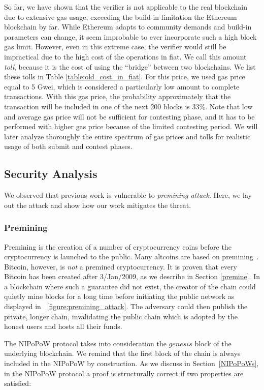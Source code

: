So far, we have shown that the verifier is not applicable to the real
blockchain due to extensive gas usage, exceeding the build-in limitation the
Ethereum blockchain by far. While Ethereum adapts to community demands and
build-in parameters can change, it seem improbable to ever incorporate such a
high block gas limit. However, even in this extreme case, the verifier would
still be impractical due to the high cost of the operations in fiat. We call
this amount \emph{toll}, because it is the cost of using the ``bridge'' between
two blockchains. We list these tolls in Table \ref{table:old_cost_in_fiat}. For
this price, we used gas price equal to 5 Gwei, which is considered a
particularly low amount to complete transactions. With this gas price, the
probability approximately that the transaction will be included in one of the
next 200 blocks is 33\%. Note that low and average gas price will not be
sufficient for contesting phase, and it has to be performed with higher gas
price because of the limited contesting period. We will later analyze
thoroughly the entire spectrum of gas prices and tolls for realistic usage of
both submit and contest phases.

\subsection{Security Analysis}

We observed that previous work is vulnerable to \emph{premining attack}. Here,
we lay out the attack and show how our work mitigates the threat.
\subsubsection{Premining} Premining is the creation of a number of
cryptocurrency coins before the cryptocurrency is launched to the public. Many
altcoins are based on premining~\cite{premine}. Bitcoin, however, is \emph{not}
a premined cryptocurrency. It is proven that every Bitcoin has been created
after 3/Jan/2009, as we describe in Section \ref{premine}. In a blockchain
where such a guarantee did not exist, the creator of the chain could quietly
mine blocks for a long time before initiating the public network as displayed
in ~\ref{figure:premining_attack}. The adversary could then publish the
private, longer chain, invalidating the public chain which is adopted by the
honest users and hosts all their funds.



The NIPoPoW protocol takes into consideration the $genesis$ block of the
underlying blockchain. We remind that the first block of the chain is always
included in the NIPoPoW by construction. As we discuss in
Section~\ref{NIPoPoWs}, in the NIPoPoW protocol a proof is structurally correct
if two properties are satisfied:

